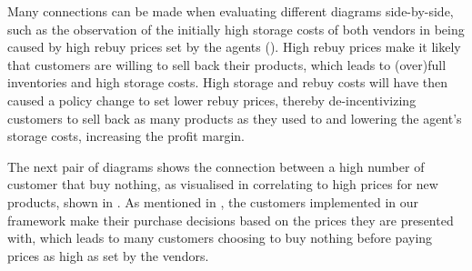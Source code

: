 Many connections can be made when evaluating different diagrams side-by-side, such as the observation of the initially high storage costs of both vendors in  being caused by high rebuy prices set by the agents (). High rebuy prices make it likely that customers are willing to sell back their products, which leads to (over)full inventories and high storage costs. High storage and rebuy costs will have then caused a policy change to set lower rebuy prices, thereby de-incentivizing customers to sell back as many products as they used to and lowering the agent's storage costs, increasing the profit margin.

The next pair of diagrams shows the connection between a high number of customer that buy nothing, as visualised in  correlating to high prices for new products, shown in . As mentioned in , the customers implemented in our framework make their purchase decisions based on the prices they are presented with, which leads to many customers choosing to buy nothing before paying prices as high as set by the vendors.

